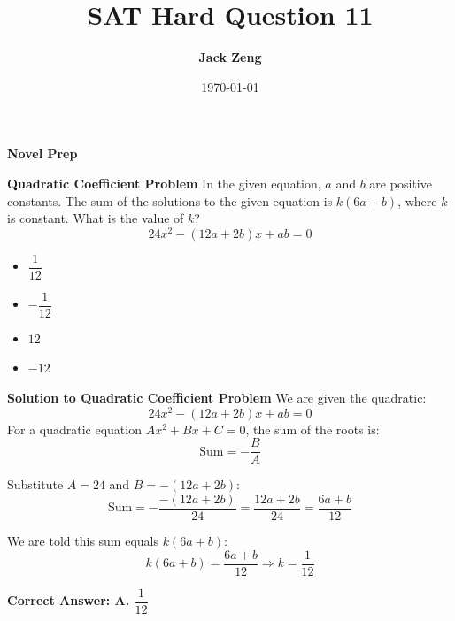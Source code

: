 \documentclass{beamer}
\title[SAT Hard Question]{\textbf{SAT Hard Question 11}}
\author{\textbf{Jack Zeng}}
\institute{\textcolor{white}{\textbf{Novel Prep}}}
\date{\today}
\begin{document}
\begin{frame}
    \titlepage
    \vfill
    \begin{flushright}
        \textcolor{purpleblue}{\Huge \textbf{Novel Prep}}
    \end{flushright}
\end{frame}


\begin{frame}
\end{frame}

\begin{frame}{\textbf{Quadratic Coefficient Problem}}
In the given equation, $a$ and $b$ are positive constants. The sum of the solutions to the given equation is $k(6a + b)$, where $k$ is constant. What is the value of $k$?
\[
24x^2 - (12a + 2b)x + ab = 0
\]

\begin{itemize}
    \item[A.] $\dfrac{1}{12}$
    \item[B.] $-\dfrac{1}{12}$
    \item[C.] $12$
    \item[D.] $-12$
\end{itemize}
\end{frame}


\begin{frame}{\textbf{Solution to Quadratic Coefficient Problem}}
We are given the quadratic:
\[
24x^2 - (12a + 2b)x + ab = 0
\]
For a quadratic equation $Ax^2 + Bx + C = 0$, the sum of the roots is:
\[
\text{Sum} = -\frac{B}{A}
\]

Substitute $A = 24$ and $B = -(12a + 2b)$:
\[
\text{Sum} = -\frac{-(12a + 2b)}{24} = \frac{12a + 2b}{24} = \frac{6a + b}{12}
\]

We are told this sum equals $k(6a + b)$:
\[
k(6a + b) = \frac{6a + b}{12} \Rightarrow k = \frac{1}{12}
\]

\textbf{Correct Answer: A. $\dfrac{1}{12}$}
\end{frame}
\end{document}
